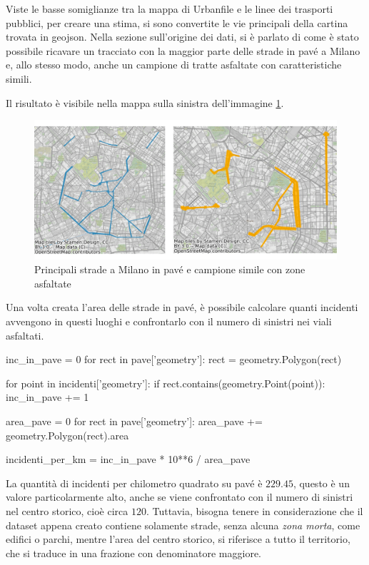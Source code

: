 \documentclass[a4paper,12pt]{report}
\newcommand{\quotestyle}[1]{\textit{#1}}
\begin{document}
Viste le basse somiglianze tra la mappa di Urbanfile e le linee dei trasporti pubblici, 
per creare una stima, si sono convertite le vie principali della cartina trovata 
in geojson. 
Nella sezione sull'origine dei dati, si è parlato di come è stato possibile ricavare 
un tracciato con la maggior parte delle strade in pavé a Milano e, allo stesso modo, 
anche un campione di tratte asfaltate con caratteristiche simili. 

Il risultato è visibile nella mappa sulla sinistra dell'immagine \ref{fig:mappa-pave}. 

\begin{figure}
    \includegraphics[width=\linewidth]{img_unite/mappa_pave_asfalto.png}
    \caption{Principali strade a Milano in pavé e campione simile con zone asfaltate}
    \label{fig:mappa-pave}
\end{figure}

Una volta creata l'area delle strade in pavé, è possibile calcolare quanti 
incidenti avvengono in questi luoghi e confrontarlo con il numero di sinistri 
nei viali asfaltati. 

\begin{code}
inc_in_pave = 0
for rect in pave['geometry']: 
    rect = geometry.Polygon(rect)

    for point in incidenti['geometry']: 
        if rect.contains(geometry.Point(point)): 
            inc_in_pave += 1

area_pave = 0
for rect in pave['geometry']: 
    area_pave += geometry.Polygon(rect).area

incidenti_per_km = inc_in_pave * 10**6 / area_pave
\end{code}

La quantità di incidenti per chilometro quadrato su pavé è $229.45$, 
questo è un valore particolarmente alto, anche se viene confrontato con il numero di 
sinistri nel centro storico, cioè circa $120$. 
Tuttavia, bisogna tenere in considerazione che il dataset appena creato 
contiene solamente strade, senza alcuna \quotestyle{zona morta}, 
come edifici o parchi, mentre l'area del centro storico, 
si riferisce a tutto il territorio, che si traduce in una frazione con 
denominatore maggiore. 
\end{document}
